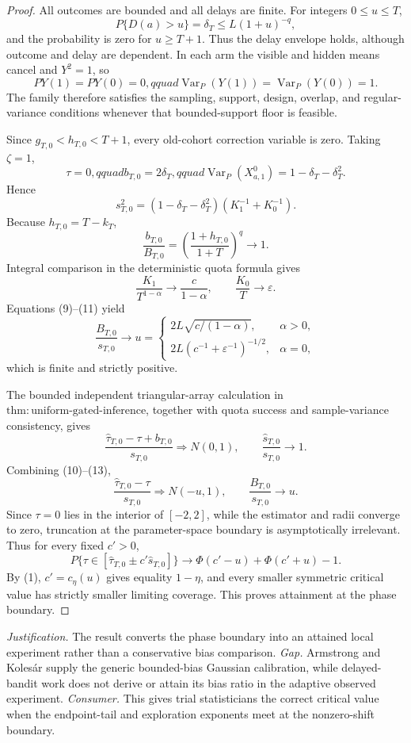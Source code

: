 \documentclass{article}
\begin{document}
\begin{proof}
All outcomes are bounded and all delays are finite.  For integers \(0\leq u\leq T\),
\[
 P\{D(a)>u\}=\delta_T\leq L(1+u)^{-q}, \tag{6}
\]
and the probability is zero for \(u\geq T+1\).  Thus the delay envelope holds, although outcome and delay are dependent.  In each arm the visible and hidden means cancel and \(Y^2=1\), so
\[
 PY(1)=PY(0)=0,qquad
 \operatorname{Var}_P(Y(1))=\operatorname{Var}_P(Y(0))=1. \tag{7}
\]
The family therefore satisfies the sampling, support, design, overlap, and regular-variance conditions whenever that bounded-support floor is feasible.

Since \(g_{T,0}<h_{T,0}<T+1\), every old-cohort correction variable is zero.  Taking \(\zeta=1\),
\[
 \tau=0,qquad b_{T,0}=2\delta_T,qquad
 \operatorname{Var}_P(X_{a,1}^{0})=1-\delta_T-\delta_T^2. \tag{8}
\]
Hence
\[
 s_{T,0}^2=(1-\delta_T-\delta_T^2)(K_1^{-1}+K_0^{-1}). \tag{9}
\]
Because \(h_{T,0}=T-k_T\),
\[
 \frac{b_{T,0}}{B_{T,0}}
 =\left(\frac{1+h_{T,0}}{1+T}\right)^q\longrightarrow1. \tag{10}
\]
Integral comparison in the deterministic quota formula gives
\[
 \frac{K_1}{T^{1-\alpha}}\longrightarrow\frac{c}{1-\alpha},
 \qquad \frac{K_0}{T}\longrightarrow\varepsilon. \tag{11}
\]
Equations (9)--(11) yield
\[
 \frac{B_{T,0}}{s_{T,0}}\longrightarrow u=
 \begin{cases}
 2L\sqrt{c/(1-\alpha)},&\alpha>0,\\
 2L(c^{-1}+\varepsilon^{-1})^{-1/2},&\alpha=0,
 \end{cases} \tag{12}
\]
which is finite and strictly positive.

The bounded independent triangular-array calculation in \(\mathrm{thm:uniform\text{-}gated\text{-}inference}\), together with quota success and sample-variance consistency, gives
\[
 \frac{\widehat\tau_{T,0}-\tau+b_{T,0}}{s_{T,0}}\Rightarrow N(0,1),
 \qquad \frac{\widehat s_{T,0}}{s_{T,0}}\longrightarrow1. \tag{13}
\]
Combining (10)--(13),
\[
 \frac{\widehat\tau_{T,0}-\tau}{s_{T,0}}\Rightarrow N(-u,1),
 \qquad \frac{B_{T,0}}{s_{T,0}}\longrightarrow u. \tag{14}
\]
Since \(\tau=0\) lies in the interior of \([-2,2]\), while the estimator and radii converge to zero, truncation at the parameter-space boundary is asymptotically irrelevant.  Thus for every fixed \(c'>0\),
\[
 P\{\tau\in[\widehat\tau_{T,0}\pm c'\widehat s_{T,0}]\}
 \longrightarrow\Phi(c'-u)+\Phi(c'+u)-1. \tag{15}
\]
By (1), \(c'=c_\eta(u)\) gives equality \(1-\eta\), and every smaller symmetric critical value has strictly smaller limiting coverage.  This proves attainment at the phase boundary.
\end{proof}
\par\smallskip\noindent \textit{Justification.} The result converts the phase boundary into an attained local experiment rather than a conservative bias comparison. \textit{Gap.} Armstrong and Kolesár supply the generic bounded-bias Gaussian calibration, while delayed-bandit work does not derive or attain its bias ratio in the adaptive observed experiment. \textit{Consumer.} This gives trial statisticians the correct critical value when the endpoint-tail and exploration exponents meet at the nonzero-shift boundary.
\end{document}
